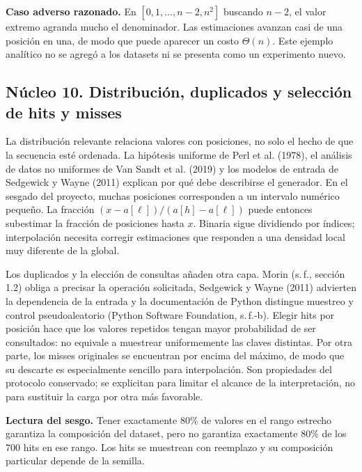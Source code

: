 \textbf{Caso adverso razonado.} En $[0,1,\ldots,n-2,n^2]$ buscando $n-2$, el valor extremo agranda mucho el denominador. Las estimaciones avanzan casi de una posición en una, de modo que puede aparecer un costo $\Theta(n)$. Este ejemplo analítico no se agregó a los datasets ni se presenta como un experimento nuevo.

\subsection{Núcleo 10. Distribución, duplicados y selección de hits y misses}
La distribución relevante relaciona valores con posiciones, no solo el hecho de que la secuencia esté ordenada. La hipótesis uniforme de Perl et al. (1978), el análisis de datos no uniformes de Van Sandt et al. (2019) y los modelos de entrada de Sedgewick y Wayne (2011) explican por qué debe describirse el generador. En el sesgado del proyecto, muchas posiciones corresponden a un intervalo numérico pequeño. La fracción $(x-a[\ell])/(a[h]-a[\ell])$ puede entonces subestimar la fracción de posiciones hasta $x$. Binaria sigue dividiendo por índices; interpolación necesita corregir estimaciones que responden a una densidad local muy diferente de la global.

Los duplicados y la elección de consultas añaden otra capa. Morin (s.\,f., sección 1.2) obliga a precisar la operación solicitada, Sedgewick y Wayne (2011) advierten la dependencia de la entrada y la documentación de Python distingue muestreo y control pseudoaleatorio (Python Software Foundation, s.\,f.-b). Elegir hits por posición hace que los valores repetidos tengan mayor probabilidad de ser consultados: no equivale a muestrear uniformemente las claves distintas. Por otra parte, los misses originales se encuentran por encima del máximo, de modo que su descarte es especialmente sencillo para interpolación. Son propiedades del protocolo conservado; se explicitan para limitar el alcance de la interpretación, no para sustituir la carga por otra más favorable.

\textbf{Lectura del sesgo.} Tener exactamente 80\% de valores en el rango estrecho garantiza la composición del dataset, pero no garantiza exactamente 80\% de los 700 hits en ese rango. Los hits se muestrean con reemplazo y su composición particular depende de la semilla.

